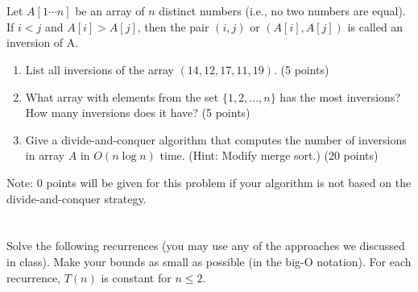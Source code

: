 \documentclass{article}
\begin{document}
\section{}
 Let $A[1\cdots n]$ be an array of $n$ distinct numbers (i.e., no two
 numbers are equal). If $i < j$ and $A[i] > A[j]$, then the pair
 $(i,j)$ or $(A[i],A[j])$ is called an inversion of A. 
 \begin{enumerate}[label=(\alph*)]
 \item List all inversions of the array $(14,12,17,11,19)$. (5 points)
 \item What array with elements from the set $\{1,2,...,n\}$ has the
   most inversions? How many inversions does it have? (5 points) 
 \item Give a divide-and-conquer algorithm that computes the number of 
   inversions in array $A$ in $O(n\log n)$ time. (Hint: Modify merge
   sort.) (20 points) 
 \end{enumerate}
Note: 0 points will be given for this problem if your algorithm is not
based on the divide-and-conquer strategy.

\section{}
 Solve the following recurrences (you may use any of the approaches we
 discussed in class). Make your bounds as small as possible (in the
 big-O notation). For each recurrence, $T(n)$ is constant for $n \le
 2$.  
\end{document}
